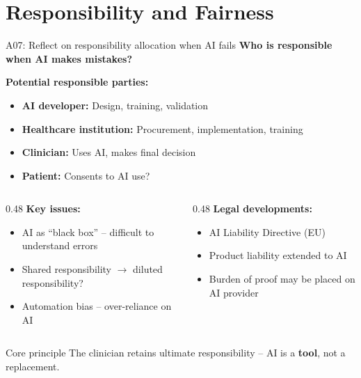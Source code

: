 \documentclass[aspectratio=169, 10pt]{beamer}
\begin{document}
\section{Responsibility and Fairness}

\begin{frame}{A07: Reflect on responsibility allocation when AI fails}
    \textbf{Who is responsible when AI makes mistakes?}
    
    \vspace{0.3cm}
    \textbf{Potential responsible parties:}
    \begin{itemize}
        \item \textbf{AI developer:} Design, training, validation
        \item \textbf{Healthcare institution:} Procurement, implementation, training
        \item \textbf{Clinician:} Uses AI, makes final decision
        \item \textbf{Patient:} Consents to AI use?
    \end{itemize}
    
    \vspace{0.3cm}
    \begin{columns}[T]
        \begin{column}{0.48\textwidth}
            \textbf{Key issues:}
            \begin{itemize}
                \item AI as ``black box'' -- difficult to understand errors
                \item Shared responsibility $\rightarrow$ diluted responsibility?
                \item Automation bias -- over-reliance on AI
            \end{itemize}
        \end{column}
        \begin{column}{0.48\textwidth}
            \textbf{Legal developments:}
            \begin{itemize}
                \item AI Liability Directive (EU)
                \item Product liability extended to AI
                \item Burden of proof may be placed on AI provider
            \end{itemize}
        \end{column}
    \end{columns}
    
    \begin{block}{Core principle}
        The clinician retains ultimate responsibility -- AI is a \textbf{tool}, not a replacement.
    \end{block}
\end{frame}
\end{document}
